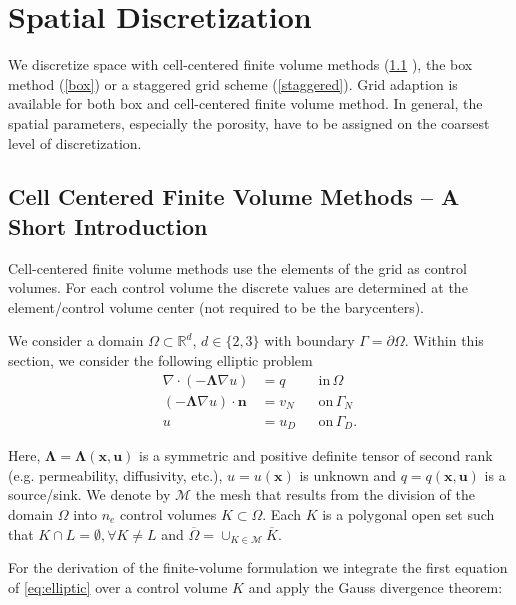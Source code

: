 \section{Spatial Discretization}
\label{spatialdiscretization}

We discretize space with cell-centered finite volume methods (\ref{cc} ), the box method (\ref{box})
or a staggered grid scheme (\ref{staggered}).
Grid adaption is available for both box and cell-centered finite volume method.
In general, the spatial  parameters, especially the porosity, have to be assigned on
the coarsest level of discretization.
%
\subsection{Cell Centered Finite Volume Methods -- A Short Introduction}\label{cc}
Cell-centered finite volume methods use the elements of the grid as control volumes.
For each control volume the discrete values are determined at the element/control
volume center (not required to be the barycenters).

We consider a domain $\Omega \subset \mathbb{R}^d$, $d \in \{ 2, 3 \}$ with boundary $\Gamma = \partial \Omega$. Within this section, we consider the following elliptic problem
\begin{equation}
  \begin{aligned}
                   \nabla \cdot \left( - \mathbf{\Lambda} \nabla u \right) &= q   &&\mathrm{in} \, \Omega \\
               \left( - \mathbf{\Lambda} \nabla u \right) \cdot \mathbf{n} &= v_N &&\mathrm{on} \, \Gamma_N \\
                                                                   u &= u_D &&\mathrm{on} \, \Gamma_D.
    \label{eq:elliptic}
  \end{aligned}
\end{equation}

Here, $\mathbf{\Lambda} = \mathbf{\Lambda}(\mathbf{x}, \mathbf{u})$ is a symmetric and positive definite tensor of second rank (e.g. permeability, diffusivity, etc.), $u = u (\mathbf{x})$ is unknown and $q = q(\mathbf{x}, \mathbf{u})$ is a source/sink.
We denote by $\mathcal{M}$ the mesh that results from the division of the domain $\Omega$ into $n_e$ control volumes $K \subset \Omega$. Each $K$ is a polygonal open set such that $K \cap L = \emptyset, \forall{K \neq L}$ and $\overline{\Omega} = \cup_{K \in \mathcal{M}} \overline{K}$.

For the derivation of the finite-volume formulation we integrate the first equation of \eqref{eq:elliptic} over a control volume $K$ and apply the Gauss divergence theorem:

